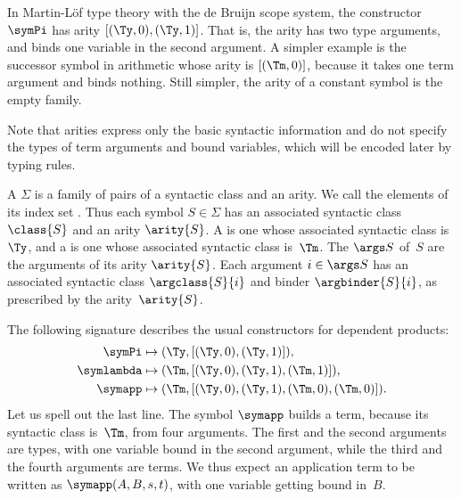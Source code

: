 \begin{example}
  In Martin-Löf type theory with the de Bruijn scope system, the constructor $\symPi$ has arity $[(\Ty,0),(\Ty,1)]$.
  That is, the arity has two type arguments, and binds one variable in the second argument.
  A simpler example is the successor symbol in arithmetic whose arity is $[(\Tm,0)]$, because it takes one term argument and binds nothing.
  Still simpler, the arity of a constant symbol is the empty family.
\end{example}

Note that arities express only the basic syntactic information and do not specify the types of term arguments and bound variables, which will be encoded later by typing rules.

\begin{definition}
  \label{def:signature}%
  A  $\Sigma$ is a family of pairs of a syntactic class and an arity.
  We call the elements of its index set . Thus each symbol $S \in \Sigma$ has an associated syntactic class $\class{S}$ and an arity $\arity{S}$.
  A  is one whose associated syntactic class is~$\Ty$, and a  is one whose associated syntactic class is~$\Tm$.
  The  $\args S$ of~$S$ are the arguments of its arity $\arity{S}$. Each argument $i \in \args S$ has an associated syntactic class $\argclass{S}{i}$ and binder $\argbinder{S}{i}$, as prescribed by the arity~$\arity{S}$.
\end{definition}

\begin{example} \label{ex:pi-types-arities}
  The following signature describes the usual constructors for dependent products:
 \begin{align*}
   \symPi & \mapsto (\Ty, [(\Ty,0),(\Ty,1)]), \\
   \symlambda & \mapsto (\Tm, [(\Ty,0), (\Ty,1), (\Tm,1)]), \\
   \symapp & \mapsto (\Tm, [(\Ty,0), (\Ty,1), (\Tm,0),(\Tm,0)]).
 \end{align*}
 Let us spell out the last line. The symbol $\symapp$ builds a term, because its syntactic class is~$\Tm$, from four arguments. The first and the second arguments are types, with one variable bound in the second argument, while the third and the fourth arguments are terms. We thus expect an application term to be written as $\symapp(A, B, s, t)$, with one variable getting bound in~$B$.
\end{example}


